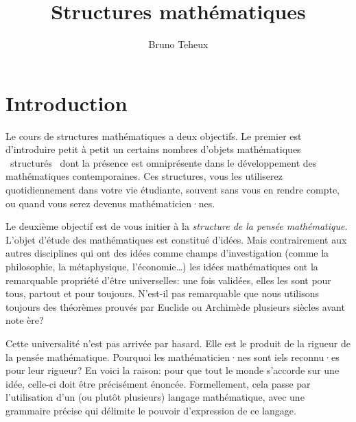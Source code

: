 \documentclass[french,course,oneside,theoremnosection]{lecture}
\title{Structures mathématiques}
\author{Bruno Teheux}
\begin{document}
%
%
%
%
%
%
%
%
%
%
%
%
%
%
%
%
%
%
%

\section{Introduction}
Le cours de structures mathématiques a deux objectifs. Le premier est d'introduire petit à petit un certains nombres d'objets mathématiques \og~structurés~\fg{} dont la présence est omniprésente dans le développement des ma\-thé\-ma\-tiques con\-tem\-poraines. Ces structures, vous les utiliserez quotidiennement dans votre vie étudiante, souvent sans vous en rendre compte, ou quand vous serez devenus mathématicien·nes.

Le deuxième objectif est de vous initier à la \emph{structure de la pensée mathématique}. L'objet d'étude des mathématiques est constitué d'idées. Mais contrairement aux autres disciplines qui ont des idées comme champs d'investigation (comme la philosophie, la métaphysique, l'économie\ldots) les idées mathématiques ont la remarquable propriété d'être universelles: une fois validées, elles les sont pour tous, partout et pour toujours. N'est-il pas remarquable que nous utilisons toujours des théorèmes prouvés par Euclide ou Archimède plusieurs siècles avant note ère?

Cette universalité n'est pas arrivée par hasard. Elle est le produit de la rigueur de la pensée mathématique. Pourquoi  les mathématicien·nes sont iels reconnu·es pour leur rigueur? En voici la raison:  pour que tout le monde s'accorde sur une idée, celle-ci doit être précisément énoncée. Formellement, cela passe par l'utilisation d'un (ou plutôt plusieurs) langage mathématique, avec une grammaire précise qui délimite le pouvoir d'expression de ce langage.  
\end{document}
